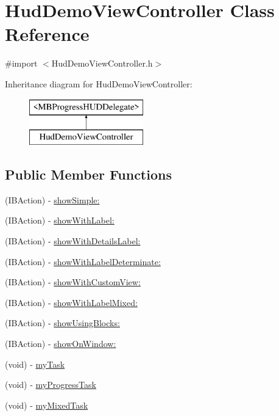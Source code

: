 \hypertarget{interface_hud_demo_view_controller}{
\section{HudDemoViewController Class Reference}
\label{interface_hud_demo_view_controller}
}


{\ttfamily \#import $<$HudDemoViewController.h$>$}

Inheritance diagram for HudDemoViewController:\begin{figure}[H]
\begin{center}
\leavevmode
\includegraphics[height=2.000000cm]{interface_hud_demo_view_controller}
\end{center}
\end{figure}
\subsection*{Public Member Functions}
\begin{DoxyCompactItemize}
\item 
(IBAction) -\/ \hyperlink{interface_hud_demo_view_controller_ab3dab197eee033cb61926849d107337a}{showSimple:}
\item 
(IBAction) -\/ \hyperlink{interface_hud_demo_view_controller_afc97b9a4e3b6524c6aed6bad2c79c832}{showWithLabel:}
\item 
(IBAction) -\/ \hyperlink{interface_hud_demo_view_controller_a2d0e07c3d1902c439e142055eb864e06}{showWithDetailsLabel:}
\item 
(IBAction) -\/ \hyperlink{interface_hud_demo_view_controller_a094342c719d0073253c017647af1294c}{showWithLabelDeterminate:}
\item 
(IBAction) -\/ \hyperlink{interface_hud_demo_view_controller_af5a2da95490929ad5cc64fa4e3d167e2}{showWithCustomView:}
\item 
(IBAction) -\/ \hyperlink{interface_hud_demo_view_controller_aca5ae4ef6b71ac6ad869052e2647d59f}{showWithLabelMixed:}
\item 
(IBAction) -\/ \hyperlink{interface_hud_demo_view_controller_a2b45069568e63ae0faa56daec7a48cd6}{showUsingBlocks:}
\item 
(IBAction) -\/ \hyperlink{interface_hud_demo_view_controller_a16b42c87535f1f75f9b3daf4b172f296}{showOnWindow:}
\item 
(void) -\/ \hyperlink{interface_hud_demo_view_controller_a6f08912115fa8a2cba0115daead1efab}{myTask}
\item 
(void) -\/ \hyperlink{interface_hud_demo_view_controller_ad766aeb107f1a50ca1a570786414e892}{myProgressTask}
\item 
(void) -\/ \hyperlink{interface_hud_demo_view_controller_a9e95c55702d626efadaba7b4523f6573}{myMixedTask}
\end{DoxyCompactItemize}
